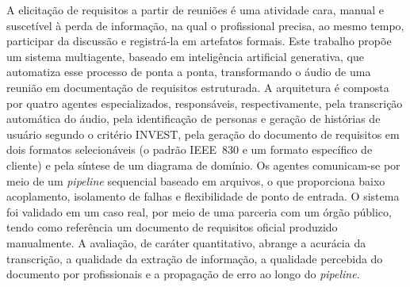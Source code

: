 
\begin{resumo}
A elicitação de requisitos a partir de reuniões é uma atividade cara, manual e suscetível à perda de informação, na qual o profissional precisa, ao mesmo tempo, participar da discussão e registrá-la em artefatos formais. Este trabalho propõe um sistema multiagente, baseado em inteligência artificial generativa, que automatiza esse processo de ponta a ponta, transformando o áudio de uma reunião em documentação de requisitos estruturada. A arquitetura é composta por quatro agentes especializados, responsáveis, respectivamente, pela transcrição automática do áudio, pela identificação de personas e geração de histórias de usuário segundo o critério INVEST, pela geração do documento de requisitos em dois formatos selecionáveis (o padrão IEEE~830 e um formato específico de cliente) e pela síntese de um diagrama de domínio. Os agentes comunicam-se por meio de um \textit{pipeline} sequencial baseado em arquivos, o que proporciona baixo acoplamento, isolamento de falhas e flexibilidade de ponto de entrada. O sistema foi validado em um caso real, por meio de uma parceria com um órgão público, tendo como referência um documento de requisitos oficial produzido manualmente. A avaliação, de caráter quantitativo, abrange a acurácia da transcrição, a qualidade da extração de informação, a qualidade percebida do documento por profissionais e a propagação de erro ao longo do \textit{pipeline}. %
\end{resumo}
